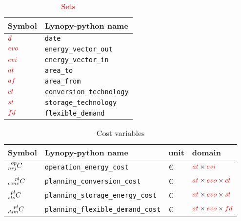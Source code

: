 \documentclass[a4paper,11pt]{article}
\begin{document}
\footnotesize
\begin{table}[h]
\footnotesize
  \centering
  \caption{\textcolor{red}{Sets} }
  \begin{tabular}{ll}
    \hline
    \textbf{Symbol} & \textbf{Lynopy-python name} \\ \hline
    $\textcolor{red}{d}$ & \verb|date|  \\  
    $\textcolor{red}{evo}$ & \verb|energy_vector_out|  \\
    $\textcolor{red}{evi}$ & \verb|energy_vector_in|  \\  
    $\textcolor{red}{at}$ & \verb|area_to|  \\ 
    $\textcolor{red}{af}$ & \verb|area_from|  \\ 
    $\textcolor{red}{ct}$ & \verb|conversion_technology|\\
    $\textcolor{red}{st}$ & \verb|storage_technology| \\
    $\textcolor{red}{fd}$ & \verb|flexible_demand| \\  \hline
  \end{tabular}
\end{table}

\begin{table}[h]
\footnotesize
  \centering
    \caption{Cost variables}
  \begin{tabular}{llll}
    \hline
    
    \textbf{Symbol} & \textbf{Lynopy-python name} & \textbf{unit}  & \textbf{domain} \\ \hline
    
    $\prescript{op}{nrj}{C}$  & \verb|operation_energy_cost|  & \euro & $\textcolor{red}{at} \times \textcolor{red}{evi}$\\ 

    $\prescript{pl}{conv}{C}$ & \verb|planning_conversion_cost|& \euro & $\textcolor{red}{at} \times \textcolor{red}{evo} \times \textcolor{red}{ct}$\\  

    $\prescript{pl}{sto}{C}$ & \verb|planning_storage_energy_cost|& \euro & $\textcolor{red}{at} \times \textcolor{red}{evo} \times \textcolor{red}{st}$ \\ 
    
    $\prescript{pl}{dsm}{C}$ & \verb|planning_flexible_demand_cost|& \euro & $\textcolor{red}{at} \times \textcolor{red}{evo} \times \textcolor{red}{fd}$ \\
    \hline
    
  \end{tabular}
\end{table}
\end{document}
